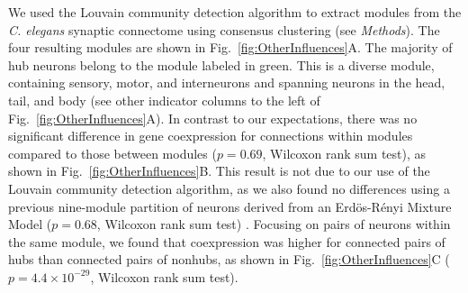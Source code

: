 \documentclass[10pt,letterpaper]{article}
\begin{document}
We used the Louvain community detection algorithm \cite{Blondel:2008do} to extract modules from the \emph{C. elegans} synaptic connectome using consensus clustering (see \textit{Methods}).
The four resulting modules are shown in Fig.~\ref{fig:OtherInfluences}A.
The majority of hub neurons belong to the module labeled in green.
This is a diverse module, containing sensory, motor, and interneurons and spanning neurons in the head, tail, and body (see other indicator columns to the left of Fig.~\ref{fig:OtherInfluences}A).
In contrast to our expectations, there was no significant difference in gene coexpression for connections within modules compared to those between modules ($p = 0.69$, Wilcoxon rank sum test), as shown in Fig.~\ref{fig:OtherInfluences}B.
This result is not due to our use of the Louvain community detection algorithm, as we also found no differences using a previous nine-module partition of neurons derived from an Erd\"os-R\'enyi Mixture Model ($p = 0.68$, Wilcoxon rank sum test) \cite{Pavlovic2014}.
Focusing on pairs of neurons within the same module, we found that coexpression was higher for connected pairs of hubs than connected pairs of nonhubs, as shown in Fig.~\ref{fig:OtherInfluences}C ($p = 4.4\times 10^{-29}$, Wilcoxon rank sum test).
\end{document}
